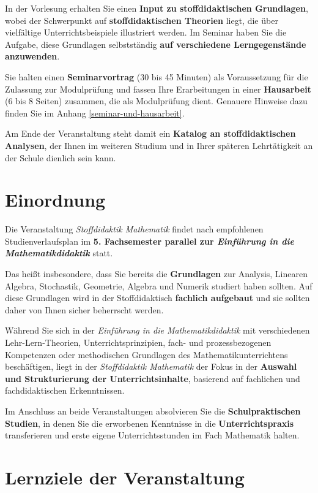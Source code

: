 \documentclass[
  ngerman,
]{scrbook}
\theoremstyle{definition}
\theoremstyle{definition}
\theoremstyle{definition}
\theoremstyle{definition}
\theoremstyle{remark}
\begin{document}
In der Vorlesung erhalten Sie einen \textbf{Input zu stoffdidaktischen Grundlagen}, wobei der Schwerpunkt auf \textbf{stoffdidaktischen Theorien} liegt, die über vielfältige Unterrichtsbeispiele illustriert werden. Im Seminar haben Sie die Aufgabe, diese Grundlagen selbstständig \textbf{auf verschiedene Lerngegenstände anzuwenden}.

Sie halten einen \textbf{Seminarvortrag} (30 bis 45 Minuten) als Voraussetzung für die Zulassung zur Modulprüfung und fassen Ihre Erarbeitungen in einer \textbf{Hausarbeit} (6 bis 8 Seiten) zusammen, die als Modulprüfung dient. Genauere Hinweise dazu finden Sie im Anhang \ref{seminar-und-hausarbeit}.

Am Ende der Veranstaltung steht damit ein \textbf{Katalog an stoffdidaktischen Analysen}, der Ihnen im weiteren Studium und in Ihrer späteren Lehrtätigkeit an der Schule dienlich sein kann.

\hypertarget{einordnung}{%
\section{Einordnung}\label{einordnung}}

Die Veranstaltung \emph{Stoffdidaktik Mathematik} findet nach empfohlenen Studienverlaufsplan im \textbf{5. Fachsemester parallel zur \emph{Einführung in die Mathematikdidaktik}} statt.

Das heißt insbesondere, dass Sie bereits die \textbf{Grundlagen} zur Analysis, Linearen Algebra, Stochastik, Geometrie, Algebra und Numerik studiert haben sollten. Auf diese Grundlagen wird in der Stoffdidaktisch \textbf{fachlich aufgebaut} und sie sollten daher von Ihnen sicher beherrscht werden.

Während Sie sich in der \emph{Einführung in die Mathematikdidaktik} mit verschiedenen Lehr-Lern-Theorien, Unterrichtsprinzipien, fach- und prozessbezogenen Kompetenzen oder methodischen Grundlagen des Mathematikunterrichtens beschäftigen, liegt in der \emph{Stoffdidaktik Mathematik} der Fokus in der \textbf{Auswahl und Strukturierung der Unterrichtsinhalte}, basierend auf fachlichen und fachdidaktischen Erkenntnissen.

Im Anschluss an beide Veranstaltungen absolvieren Sie die \textbf{Schulpraktischen Studien}, in denen Sie die erworbenen Kenntnisse in die \textbf{Unterrichtspraxis} transferieren und erste eigene Unterrichtsstunden im Fach Mathematik halten.

\hypertarget{lernziele-der-veranstaltung}{%
\section{Lernziele der Veranstaltung}\label{lernziele-der-veranstaltung}}
\end{document}
